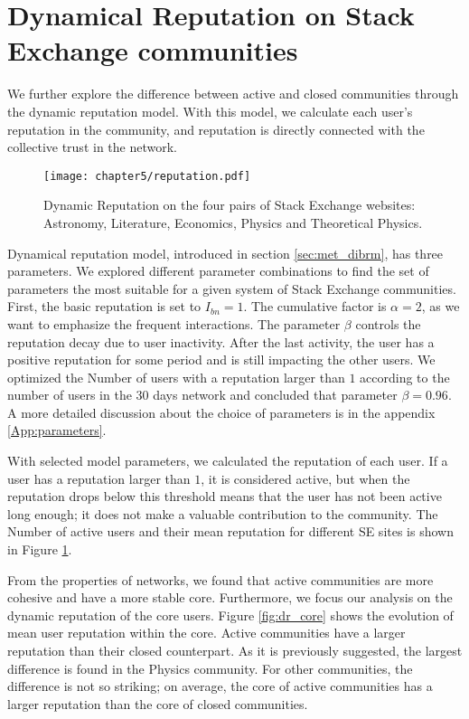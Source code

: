 \section{Dynamical Reputation on Stack Exchange communities}

We further explore the difference between active and closed communities through the dynamic reputation model. With this model, we calculate each user's reputation in the community, and reputation is directly connected with the collective trust in the network. 

\begin{figure}[h]
	\centering
	\texttt{[image: chapter5/reputation.pdf]}
	\caption[Dynamic Reputation of Stack Exchange websites.]{Dynamic Reputation on the four pairs of Stack Exchange websites: Astronomy, Literature, Economics,  Physics and Theoretical Physics.}
	\label{fig:dr6panel}
\end{figure}

Dynamical reputation model, introduced in section \ref{sec:met_dibrm}, has three parameters. We explored different parameter combinations to find the set of parameters the most suitable for a given system of Stack Exchange communities. First, the basic reputation is set to $I_{bn}=1$. The cumulative factor is $\alpha=2$, as we want to emphasize the frequent interactions. The parameter $\beta$ controls the reputation decay due to user inactivity. After the last activity, the user has a positive reputation for some period and is still impacting the other users. We optimized the Number of users with a reputation larger than $1$ according to the number of users in the 30 days network and concluded that parameter $\beta=0.96$. A more detailed discussion about the choice of parameters is in the appendix \ref{App:parameters}. 

With selected model parameters, we calculated the reputation of each user. If a user has a reputation larger than $1$, it is considered active, but when the reputation drops below this threshold means that the user has not been active long enough; it does not make a valuable contribution to the community. The Number of active users and their mean reputation for different SE sites is shown in Figure \ref{fig:dr6panel}. 

From the properties of networks, we found that active communities are more cohesive and have a more stable core. Furthermore, we focus our analysis on the dynamic reputation of the core users. Figure \ref{fig:dr_core} shows the evolution of mean user reputation within the core. Active communities have a larger reputation than their closed counterpart. As it is previously suggested, the largest difference is found in the Physics community. For other communities, the difference is not so striking; on average, the core of active communities has a larger reputation than the core of closed communities. 

